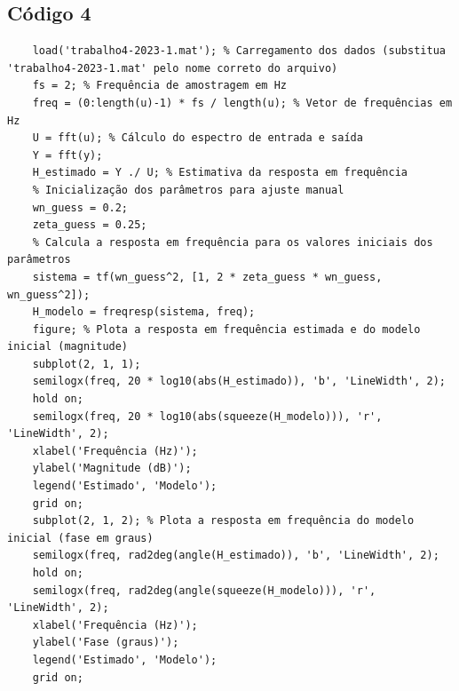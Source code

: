 \documentclass[10pt]{article}
\begin{document}
\begin{appendices}
\newpage

\section{Código 4}

\begin{verbatim}
    load('trabalho4-2023-1.mat'); % Carregamento dos dados (substitua 'trabalho4-2023-1.mat' pelo nome correto do arquivo)
    fs = 2; % Frequência de amostragem em Hz 
    freq = (0:length(u)-1) * fs / length(u); % Vetor de frequências em Hz
    U = fft(u); % Cálculo do espectro de entrada e saída
    Y = fft(y);
    H_estimado = Y ./ U; % Estimativa da resposta em frequência
    % Inicialização dos parâmetros para ajuste manual
    wn_guess = 0.2;
    zeta_guess = 0.25;
    % Calcula a resposta em frequência para os valores iniciais dos parâmetros
    sistema = tf(wn_guess^2, [1, 2 * zeta_guess * wn_guess, wn_guess^2]);
    H_modelo = freqresp(sistema, freq);
    figure; % Plota a resposta em frequência estimada e do modelo inicial (magnitude)
    subplot(2, 1, 1);
    semilogx(freq, 20 * log10(abs(H_estimado)), 'b', 'LineWidth', 2);
    hold on;
    semilogx(freq, 20 * log10(abs(squeeze(H_modelo))), 'r', 'LineWidth', 2);
    xlabel('Frequência (Hz)');
    ylabel('Magnitude (dB)');
    legend('Estimado', 'Modelo');
    grid on;
    subplot(2, 1, 2); % Plota a resposta em frequência do modelo inicial (fase em graus)
    semilogx(freq, rad2deg(angle(H_estimado)), 'b', 'LineWidth', 2);
    hold on;
    semilogx(freq, rad2deg(angle(squeeze(H_modelo))), 'r', 'LineWidth', 2);
    xlabel('Frequência (Hz)');
    ylabel('Fase (graus)');
    legend('Estimado', 'Modelo');
    grid on;
\end{verbatim}

\end{appendices}
\end{document}
